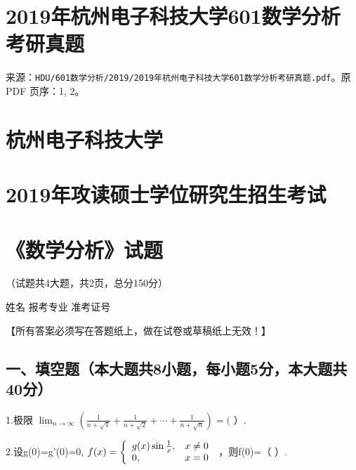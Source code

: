 \documentclass[11pt,fontset=fandol]{ctexart}
\begin{document}
\section{2019年杭州电子科技大学601数学分析考研真题}\label{ux5e74ux676dux5ddeux7535ux5b50ux79d1ux6280ux5927ux5b66601ux6570ux5b66ux5206ux6790ux8003ux7814ux771fux9898}

来源：\texttt{HDU/601数学分析/2019/2019年杭州电子科技大学601数学分析考研真题.pdf}。原
PDF 页序：1, 2。

\section{杭州电子科技大学}\label{ux676dux5ddeux7535ux5b50ux79d1ux6280ux5927ux5b66}

\section{2019年攻读硕士学位研究生招生考试}\label{ux5e74ux653bux8bfbux7855ux58ebux5b66ux4f4dux7814ux7a76ux751fux62dbux751fux8003ux8bd5}

\section{《数学分析》试题}\label{ux6570ux5b66ux5206ux6790ux8bd5ux9898}

（试题共4大题，共2页，总分150分）

姓名 报考专业 准考证号

【所有答案必须写在答题纸上，做在试卷或草稿纸上无效！】

\subsection{一、填空题（本大题共8小题，每小题5分，本大题共40分）}\label{ux4e00ux586bux7a7aux9898ux672cux5927ux9898ux51718ux5c0fux9898ux6bcfux5c0fux98985ux5206ux672cux5927ux9898ux517140ux5206}

1.极限
\(\lim _ { n \to \infty } \left( { \frac { 1 } { n + { \sqrt { 1 } } } } + { \frac { 1 } { n + { \sqrt { 2 } } } } + \cdots + { \frac { 1 } { n + { \sqrt { n } } } } \right) = (\)
）.

2.设g(0)=g'(0)=0,
\(f ( x ) = { \left\{ \begin{array} { l l } { g ( x ) \sin { \frac { 1 } { x } } , } & { x \neq 0 } \\ { 0 , } & { x = 0 } \end{array} \right. }\)
，则f(0)=（ ）.
\end{document}

